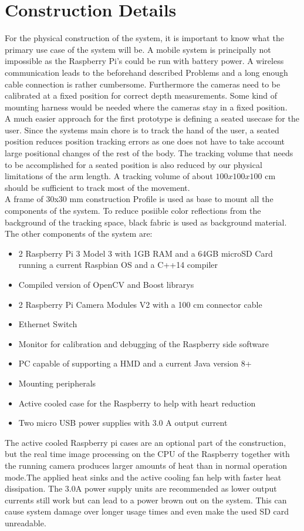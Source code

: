 \section{Construction Details}
For the physical construction of the system, it is important to know what the primary use case of the system will be. A mobile system is principally not impossible as the Raspberry Pi's could be run with battery power. A wireless communication leads to the beforehand described Problems and a long enough cable connection is rather cumbersome. Furthermore the cameras need to be calibrated at a fixed position for correct depth measurements. Some kind of mounting harness would be needed where the cameras stay in a fixed position.\\
A much easier approach for the first prototype is defining a seated usecase for the user. Since the systems main chore is to track the hand of the user, a seated position reduces position tracking errors as one does not have to take account large positional changes of the rest of the body.
The tracking volume that needs to be accomplished for a seated position is also reduced by our physical limitations of the arm length. A tracking volume of about $100x100x100$ cm should be sufficient to track most of the movement.\\
A frame of 30x30 mm construction Profile is used as base to mount all the components of the system. To reduce posiible color reflections from the background of the tracking space, black fabric is used as background material. The other components of the system are:
\begin{itemize}
\item 2 Raspberry Pi 3 Model 3 with 1GB RAM and a 64GB microSD Card running a current Raspbian OS and a C++14 compiler
\item Compiled version of OpenCV and Boost librarys
\item 2 Raspberry Pi Camera Modules V2 with a 100 cm connector cable
\item Ethernet Switch
\item Monitor for calibration and debugging of the Raspberry side software
\item PC capable of supporting a HMD and a current Java version 8+
\item Mounting peripherals
\item Active cooled case for the Raspberry to help with heart reduction
\item Two micro USB power supplies with 3.0 A output current
\end{itemize}
The active cooled Raspberry pi cases are an optional part of the construction, but the real time image processing on the CPU of the Raspberry together with the running camera produces larger amounts of heat than in normal operation mode.The applied heat sinks and the active cooling fan help with faster heat dissipation. The 3.0A power supply units are recommended as lower output currents still work but can lead to a power brown out on the system. This can cause system damage over longer usage times and even make the used SD card unreadable.
